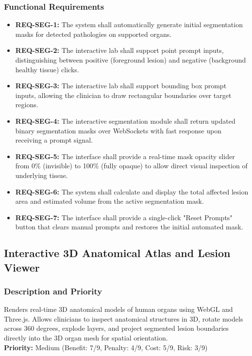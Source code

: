 \documentclass[12pt,a4paper]{report}
\begin{document}
\subsubsection{Functional Requirements}
\begin{itemize}
    \item \textbf{REQ-SEG-1:} The system shall automatically generate initial segmentation masks for detected pathologies on supported organs.
    \item \textbf{REQ-SEG-2:} The interactive lab shall support point prompt inputs, distinguishing between positive (foreground lesion) and negative (background healthy tissue) clicks.
    \item \textbf{REQ-SEG-3:} The interactive lab shall support bounding box prompt inputs, allowing the clinician to draw rectangular boundaries over target regions.
    \item \textbf{REQ-SEG-4:} The interactive segmentation module shall return updated binary segmentation masks over WebSockets with fast response upon receiving a prompt signal.
    \item \textbf{REQ-SEG-5:} The interface shall provide a real-time mask opacity slider from 0\% (invisible) to 100\% (fully opaque) to allow direct visual inspection of underlying tissue.
    \item \textbf{REQ-SEG-6:} The system shall calculate and display the total affected lesion area and estimated volume from the active segmentation mask.
    \item \textbf{REQ-SEG-7:} The interface shall provide a single-click "Reset Prompts" button that clears manual prompts and restores the initial automated mask.
\end{itemize}

\subsection{Interactive 3D Anatomical Atlas and Lesion Viewer}
\subsubsection{Description and Priority}
Renders real-time 3D anatomical models of human organs using WebGL and Three.js. Allows clinicians to inspect anatomical structures in 3D, rotate models across 360 degrees, explode layers, and project segmented lesion boundaries directly into the 3D organ mesh for spatial orientation.\\
\textbf{Priority:} Medium (Benefit: 7/9, Penalty: 4/9, Cost: 5/9, Risk: 3/9)
\end{document}
